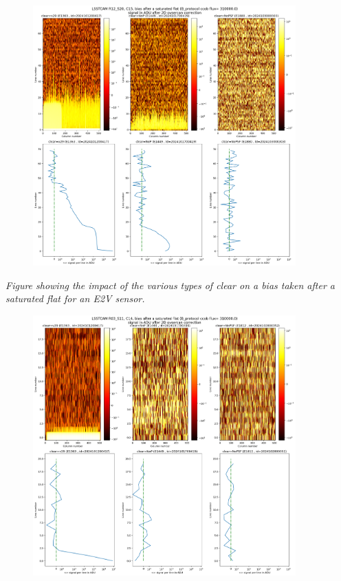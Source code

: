 \begin{figure}
\begin{centering}
\includegraphics[width=0.9\textwidth]{sections/figures/plots_R12_S20_C15_E1880_bias_2024103000303.png}
\end{centering}
\end{figure}

\emph{Figure showing the impact of the various types of clear on a bias
taken after a saturated flat for an E2V sensor.}

\begin{figure}
\begin{centering}
\includegraphics[width=0.9\textwidth]{sections/figures/plots_R03_S11_C14_E1812_bias_2024102800352.png}
\end{centering}
\end{figure}

